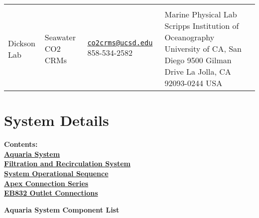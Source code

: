 \documentclass[]{book}
\begin{document}
\begin{longtable}[]{@{}llll@{}}
\begin{minipage}[t]{0.06\columnwidth}
\end{minipage}\tabularnewline
\begin{minipage}[t]{0.06\columnwidth}\raggedright\strut
Dickson Lab\strut
\end{minipage} & \begin{minipage}[t]{0.06\columnwidth}\raggedright\strut
Seawater CO2 CRMs\strut
\end{minipage} & \begin{minipage}[t]{0.06\columnwidth}\raggedright\strut
\href{mailto:co2crms@ucsd.edu}{\nolinkurl{co2crms@ucsd.edu}}
858-534-2582\strut
\end{minipage} & \begin{minipage}[t]{0.06\columnwidth}\raggedright\strut
Marine Physical Lab Scripps Institution of Oceanography University of
CA, San Diego 9500 Gilman Drive La Jolla, CA 92093-0244 USA\strut
\end{minipage}\tabularnewline
\bottomrule
\end{longtable}

\chapter{System Details}\label{system-details}

\textbf{Contents:}\\
\href{03-system_details.md\#Tank_System}{\textbf{Aquaria System}}\\
\href{03-system_details.md\#Filtration_and_Recirculation_System}{\textbf{Filtration
and Recirculation System}}\\
\href{03-system_details.md\#System_Operational_Sequence}{\textbf{System
Operational Sequence}}\\
\href{03-system_details.md\#Apex_Connection_Series}{\textbf{Apex
Connection Series}}\\
\href{03-system_details.md\#EB832_Outlet_Connections}{\textbf{EB832
Outlet Connections}}

\textbf{Aquaria System Component List}
\end{document}
